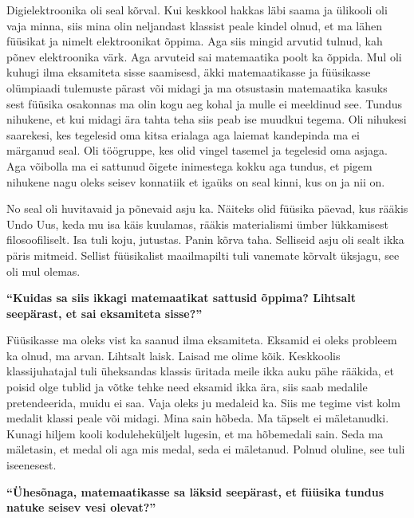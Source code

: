 Digielektroonika oli seal kõrval. Kui keskkool hakkas läbi saama ja ülikooli oli vaja minna, siis mina olin neljandast klassist peale kindel olnud, et ma lähen füüsikat ja nimelt elektroonikat õppima. Aga siis mingid arvutid tulnud, kah põnev elektroonika värk. Aga arvuteid sai matemaatika poolt ka õppida. Mul oli kuhugi ilma eksamiteta sisse saamisesd, äkki matemaatikasse ja füüsikasse olümpiaadi tulemuste pärast või midagi ja ma otsustasin matemaatika kasuks sest füüsika osakonnas ma olin kogu aeg kohal ja mulle ei meeldinud see. Tundus nihukene, et kui midagi ära tahta teha siis peab ise muudkui tegema. Oli nihukesi saarekesi, kes tegelesid oma kitsa erialaga aga laiemat kandepinda ma ei märganud seal. Oli töögruppe, kes olid vingel tasemel ja tegelesid oma asjaga. Aga võibolla ma ei sattunud õigete inimestega kokku aga tundus, et pigem nihukene nagu oleks seisev konnatiik et igaüks on seal kinni, kus on ja nii on. 

No seal oli huvitavaid ja põnevaid asju ka. Näiteks olid füüsika päevad, kus rääkis Undo Uus, keda mu isa käis kuulamas, rääkis materialismi ümber lükkamisest filosoofiliselt. Isa tuli koju, jutustas. Panin kõrva taha. Selliseid asju oli sealt ikka päris mitmeid. Sellist füüsikalist maailmapilti tuli vanemate kõrvalt üksjagu, see oli mul olemas. 

\textbf{\enquote{Kuidas sa siis ikkagi matemaatikat sattusid õppima? Lihtsalt seepärast, et sai eksamiteta sisse?}}

Füüsikasse ma oleks vist ka saanud ilma eksamiteta. Eksamid ei oleks probleem ka olnud, ma arvan. Lihtsalt laisk. Laisad me olime kõik. Keskkoolis klassijuhatajal tuli üheksandas klassis üritada meile ikka auku pähe rääkida, et poisid olge tublid ja võtke tehke need eksamid ikka ära, siis saab medalile pretendeerida, muidu ei saa. Vaja oleks ju medaleid ka. Siis me tegime vist kolm medalit klassi peale või midagi. Mina sain hõbeda. Ma täpselt ei mäletanudki. Kunagi hiljem kooli koduleheküljelt lugesin, et ma hõbemedali sain. Seda ma mäletasin, et medal oli aga mis medal, seda ei mäletanud. Polnud oluline, see tuli iseenesest. 

\textbf{\enquote{Ühesõnaga, matemaatikasse sa läksid seepärast, et füüsika tundus natuke seisev vesi olevat?}}

